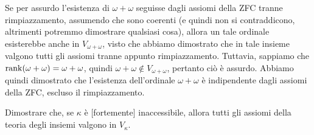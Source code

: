 \begin{soln}
	Se per assurdo l'esistenza di $\omega + \omega$ seguisse dagli assiomi della ZFC tranne rimpiazzamento, assumendo che sono coerenti (e quindi non si contraddicono, altrimenti potremmo dimostrare qualsiasi cosa),
	allora un tale ordinale esisterebbe anche in $V_{\omega + \omega}$, visto che abbiamo dimostrato che in tale insieme valgono tutti gli assiomi tranne appunto rimpiazzamento.
	Tuttavia, sappiamo che $\operatorname{rank}(\omega + \omega) = \omega + \omega$, quindi $\omega + \omega \not \in V_{\omega + \omega}$, pertanto ci\`o \`e assurdo. Abbiamo quindi dimostrato che l'esistenza dell'ordinale $\omega + \omega$ \`e indipendente dagli assiomi della ZFC, escluso il rimpiazzamento.
\end{soln}

\begin{exercise}
	Dimostrare che, se $\kappa$ \`e [fortemente] inaccessibile, allora tutti gli assiomi della teoria degli insiemi valgono in $V_\kappa$.
\end{exercise}

